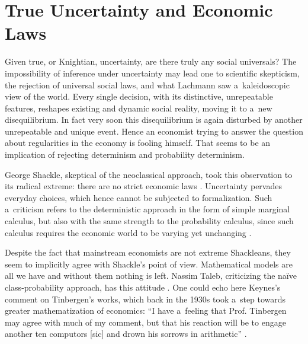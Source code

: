 \section{True Uncertainty and Economic Laws}

Given true, or Knightian, uncertainty, are there truly any social universals? The impossibility of inference under uncertainty may lead one to scientific skepticism, the rejection of universal social laws, and what Lachmann 
\parencite*[][]{lachmann_mises_1976} %
 saw a~kaleidoscopic view of the world. Every single decision, with its distinctive, unrepeatable features, reshapes existing and dynamic social reality, moving it to a~new disequilibrium. In fact very soon this disequilibrium is again disturbed by another unrepeatable and unique event. Hence an economist trying to answer the question about regularities in the economy is fooling himself. That seems to be an implication of rejecting determinism and probability determinism.



George Shackle, skeptical of the neoclassical approach, took this observation to its radical extreme: there are no strict economic laws 
\parencite[][p.427]{shackle_epistemics_1972}. %
 Uncertainty pervades everyday choices, which hence cannot be subjected to formalization. Such a~criticism refers to the deterministic approach in the form of simple marginal calculus, but also with the same strength to the probability calculus, since such calculus requires the economic world to be varying yet unchanging 
\parencite[][p.381]{shackle_epistemics_1972}.%




Despite the fact that mainstream economists are not extreme Shackleans, they seem to implicitly agree with Shackle's point of view. Mathematical models are all we have and without them nothing is left. Nassim Taleb, criticizing the naïve class-probability approach, has this attitude 
\parencite[][p.276]{taleb_black_2007}. %
 One could echo here Keynes's comment on Tinbergen's works, which back in the 1930s took a~step towards greater mathematization of economics: ``I have a~feeling that Prof. Tinbergen may agree with much of my comment, but that his reaction will be to engage another ten computors [sic] and drown his sorrows in arithmetic'' 
\parencite[][p.568]{keynes_professor_1939}.%




